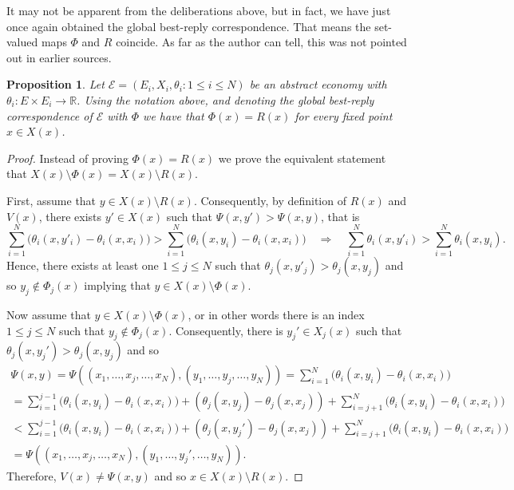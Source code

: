 \documentclass[a4paper,11pt,reqno,english]{amsart}
\newtheorem{proposition}[theorem]{Proposition}
\theoremstyle{definition}
\begin{document}
It may not be apparent from the deliberations above, but in fact, we have just once again obtained the global best-reply correspondence.
That means the set-valued maps $\Phi$ and $R$ coincide.
As far as the author can tell, this was not pointed out in earlier sources.

\begin{proposition}\label{prop:NI_brings_nothing_new}
	Let $\mathcal{E}= (E_i,X_i,\theta_i : 1\leq i\leq N)$ be an abstract economy with $\theta_i\colon E\times E_i\longrightarrow\mathbb{R}$.
	Using the notation above, and denoting the global best-reply correspondence of $\mathcal{E}$ with $\Phi$ we have that $\Phi(x) = R(x)$ for every fixed point $x\in X(x)$.
\end{proposition}
\begin{proof}
	Instead of proving $\Phi(x)=R(x)$ we prove the equivalent statement that $X(x)\setminus\Phi(x)=X(x)\setminus R(x)$.

	\medskip\noindent
	First, assume that $y\in X(x)\setminus R(x)$.
	Consequently, by definition of $R(x)$ and $V(x)$, there exists $y'\in X(x)$ such that $\Psi(x,y') > \Psi(x,y)$, that is
	\[
		\sum_{i=1}^{N}\bigl(\theta_i(x,y'_i)-\theta_i(x,x_i)\bigr) > \sum_{i=1}^{N}\bigl(\theta_i(x,y_i)-\theta_i(x,x_i)\bigr) \quad \Longrightarrow \quad
		\sum_{i=1}^{N}\theta_i(x,y'_i) > \sum_{i=1}^{N}\theta_i(x,y_i).
	\]
	Hence, there exists at least one $1\leq j\leq N$ such that $\theta_j(x,y'_j) > \theta_j(x,y_j)$ and so $y_j\not\in \Phi_j(x)$ implying that  $y\in X(x)\setminus\Phi(x)$.

	\medskip
	Now assume that $y \in X(x)\setminus\Phi(x)$, or in other words there is an index $1\leq j\leq N$ such that $y_j\not\in \Phi_j(x)$.
	Consequently, there is $y_j'\in X_j(x)$ such that $\theta_j(x,y_j') > \theta_j(x,y_j)$ and so
	\begin{multline*}
		\Psi(x,y) = \Psi((x_1,\dots,x_j,\dots,x_N),(y_1,\dots,y_j,\dots,y_N)) = \sum_{i=1}^{N}\bigl(\theta_i(x,y_i)-\theta_i(x,x_i)\bigr) \\ =
		\sum_{i=1}^{j-1}\bigl(\theta_i(x,y_i)-\theta_i(x,x_i)\bigr) + (\theta_j(x,y_j)-\theta_j(x,x_j)) + \sum_{i=j+1}^{N}\bigl(\theta_i(x,y_i)-\theta_i(x,x_i)\bigr) \\ < \sum_{i=1}^{j-1}\bigl(\theta_i(x,y_i)-\theta_i(x,x_i)\bigr) + (\theta_j(x,y_j')-\theta_j(x,x_j)) + \sum_{i=j+1}^{N}\bigl(\theta_i(x,y_i)-\theta_i(x,x_i)\bigr)   \\ =  \Psi((x_1,\dots,x_j,\dots,x_N),(y_1,\dots,y_j',\dots,y_N)).
	\end{multline*}
	Therefore, $V(x)\neq\Psi(x,y)$ and so $x\in X(x)\setminus R(x)$.
\end{proof}
\end{document}

